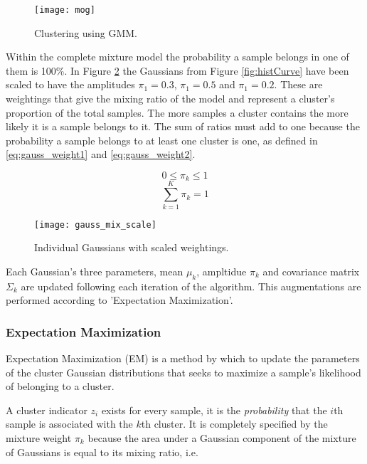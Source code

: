 \begin{figure}[H]
	\centering
	\centering\texttt{[image: mog]}
	\caption{Clustering using GMM.}
	\label{fig:mogcov}
\end{figure}
  
Within the complete mixture model the probability a sample belongs in one of them is 100\%. In Figure \ref{fig:histScale} the Gaussians from Figure \ref{fig:histCurve} have been scaled to have the amplitudes $\pi_1 = 0.3$, $\pi_1 = 0.5$ and $\pi_1 = 0.2$. These are weightings that give the mixing ratio of the model and represent a cluster's proportion of the total samples. The more samples a cluster contains the more likely it is a sample belongs to it. The sum of ratios must add to one because the probability a sample belongs to at least one cluster is one, as defined in \ref{eq:gauss_weight1} and \ref{eq:gauss_weight2}.

\begin{equation}
    0\leq \pi_k \leq 1
\label{eq:gauss_weight1}
\end{equation}
\begin{equation}
    \sum_{k=1}^{K}\pi_k = 1
\label{eq:gauss_weight2}
\end{equation}


\begin{figure}[H]
    \centering
    \centering\texttt{[image: gauss\_mix\_scale]}
    \caption{Individual Gaussians with scaled weightings.}
    \label{fig:histScale}
  \end{figure} 

Each Gaussian's three parameters, mean $\mu_k$, ampltidue $\pi_k$ and covariance matrix $\Sigma_k$ are updated following each iteration of the algorithm. This augmentations are performed according to 'Expectation Maximization'.

\subsubsection{Expectation Maximization}

Expectation Maximization (EM) is a method by which to update the parameters of the cluster Gaussian distributions that seeks to maximize a sample's likelihood of belonging to a cluster. 

A cluster indicator $z_i$ exists for every sample, it is the \emph{probability} that the $i$th sample is associated with the $k$th cluster. It is completely specified by the mixture weight $\pi_k$ because the area under a Gaussian component of the mixture of Gaussians is equal to its mixing ratio, i.e.

